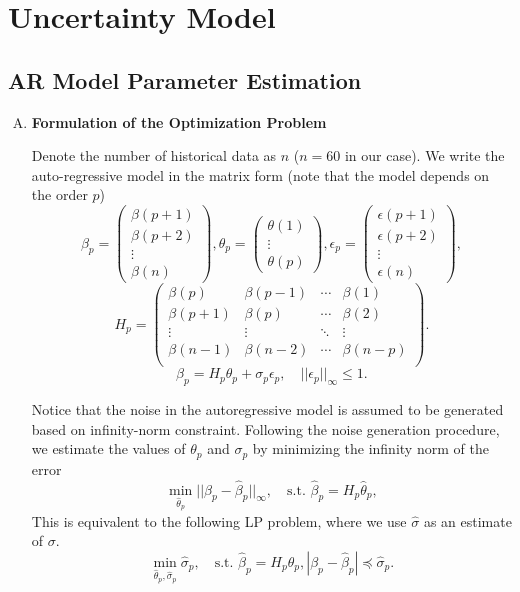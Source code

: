 
\section{\textbf{Uncertainty Model}}

\subsection{AR Model Parameter Estimation}

\begin{enumerate}[A)]

\item \textbf{Formulation of the Optimization Problem}

    Denote the number of historical data as $n$ ($n=60$ in our case). We write the auto-regressive model in the matrix form (note that the model depends on the order $p$)
	\[
	\beta_p = \begin{pmatrix} 
		\beta(p+1)  \\
		\beta(p+2)  \\
		\vdots \\
		\beta(n) 
	\end{pmatrix},
	\theta_p = \begin{pmatrix} 
		\theta(1)  \\
		\vdots \\
		\theta(p) 
	\end{pmatrix},
    \epsilon_p = \begin{pmatrix} 
		\epsilon(p+1)  \\
		\epsilon(p+2)  \\
		\vdots \\
		\epsilon(n) 
	\end{pmatrix},
	\]
    \[
    H_p = \begin{pmatrix} 
        \beta(p)   & \beta(p-1) & \cdots & \beta(1)   \\
        \beta(p+1) & \beta(p)   & \cdots & \beta(2)   \\
        \vdots     & \vdots     & \ddots & \vdots     \\
        \beta(n-1) & \beta(n-2) & \cdots & \beta(n-p) \\
    \end{pmatrix}.
    \]
	\[ 
	\beta_p=H_p\theta_p+\sigma_p\epsilon_p, \quad ||\epsilon_p||_\infty \leq 1.
	\]

	Notice that the noise in the autoregressive model is assumed to be generated based on infinity-norm constraint. Following the noise generation procedure, we estimate the values of $\theta_p$ and $\sigma_p$ by minimizing the infinity norm of the error
	\[
	\min_{\hat{\theta}_p}||\beta_p-\hat{\beta}_p||_\infty, \quad
    \text{s.t. }\hat{\beta}_p = H_p\hat{\theta}_p,
	\]
	This is equivalent to the following LP problem, where we use $\hat{\sigma}$ as an estimate of $\sigma$.
	\begin{equation}\label{eq:ar_opt} 
	\min_{\hat{\theta}_p, \hat{\sigma}_p}\hat{\sigma}_p, \quad
    \text{s.t. }\hat{\beta}_p=H_p\hat{\theta}_p,|\beta_p-\hat{\beta}_p|\preceq\hat{\sigma}_p.
	\end{equation}


\end{enumerate}
